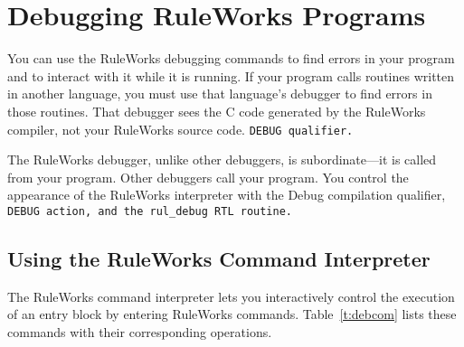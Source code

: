 \chapter{Debugging RuleWorks Programs}
\label{c:debugging}

You can use the RuleWorks debugging commands to find errors in your
program and to interact with it while it is running. If your program
calls routines written in another language, you must use that
language's debugger to find errors in those routines. That debugger
sees the C code generated by the RuleWorks compiler, not your
RuleWorks source code. \tt{DEBUG} qualifier.

\begin{note}
  The RuleWorks debugger, unlike other debuggers, is subordinate---it
  is called from your program. Other debuggers call your program. You
  control the appearance of the RuleWorks interpreter with the Debug
  compilation qualifier, \tt{DEBUG} action, and the \verb|rul_debug|
  RTL routine.
\end{note}

\section{Using the RuleWorks Command Interpreter}

The RuleWorks command interpreter lets you interactively control the
execution of an entry block by entering RuleWorks commands.
Table~\ref{t:debcom} lists these commands with their corresponding
operations.

